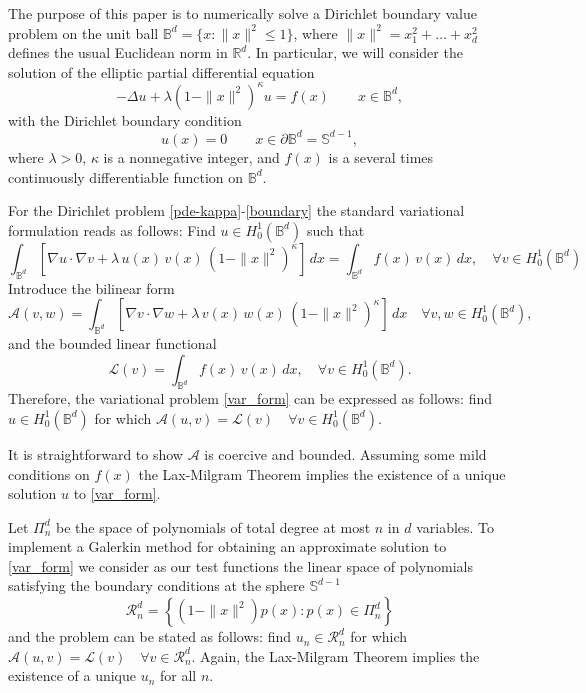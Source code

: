 \documentclass{amsart}
\theoremstyle{plain}%
\theoremstyle{definition}
\theoremstyle{remark}
\begin{document}
The purpose of this paper is to numerically solve a Dirichlet boundary value problem on the 
unit ball \(\mathbb{B}^d = \{x: \|x\|^2\le 1\}\), where \(\|x\|^2 = x_1^2 + \ldots +x_d^2\) defines the usual Euclidean norm in \(\mathbb{R}^d\). In particular, we will consider the solution of the elliptic partial differential equation
\begin{equation} \label{pde-kappa}
 -  \Delta u  + \lambda(1-\|x\|^2)^{\kappa}u = f(x) \qquad x \in {\mathbb B}^d,
\end{equation}
with the Dirichlet boundary condition
\begin{equation} \label{boundary}
 u(x)= 0 \qquad x \in \partial\mathbb{B}^d = {\mathbb S}^{d-1},
\end{equation}
where \(\lambda>0\), \(\kappa\) is a nonnegative integer, and \(f(x)\) is a several times continuously differentiable function on \({\mathbb B}^d\).

For the Dirichlet problem \eqref{pde-kappa}-\eqref{boundary} the standard variational formulation reads as follows: Find \(u \in H^1_0({\mathbb B}^d)\) such that
\begin{equation} \label{var_form}
\int_{{\mathbb B}^d} \left[\nabla u \cdot\nabla v + \lambda\, u(x)\,v(x)\,(1-\|x\|^2)^{\kappa}\right]\,dx = \int_{{\mathbb B}^d} f(x)\, v(x)\,dx, \quad \forall 
v \in H^1_0({\mathbb B}^d)
\end{equation}
Introduce the bilinear form  
\begin{equation} \label{bil_form_A}
\mathcal{A}(v,w) = \int_{{\mathbb B}^d} \left[\nabla v \cdot\nabla w + \lambda\, v(x)\,w(x)\,(1-\|x\|^2)^{\kappa}\right]\,dx  \quad \forall 
v, w \in H^1_0({\mathbb B}^d),
\end{equation}
and the bounded linear functional
\[
\mathcal{L}(v) = \int_{{\mathbb B}^d} f(x)\, v(x)\,dx, \quad \forall 
v \in H^1_0({\mathbb B}^d).
\]
Therefore, the variational problem \eqref{var_form} can be expressed as follows: find \(u \in H^1_0({\mathbb B}^d)\) for which \(\mathcal{A}(u,v) = \mathcal{L}(v) \quad \forall v \in H^1_0({\mathbb B}^d).\) 

It is straightforward to show \(\mathcal{A}\) is coercive and bounded. Assuming some mild conditions on \(f(x)\) the Lax-Milgram Theorem implies the existence of a unique solution \(u\) to \eqref{var_form}. 

Let $\Pi_n^d$ be the space of polynomials of total degree at most $n$ in $d$ variables. 
To implement a Galerkin method for obtaining an approximate solution to \eqref{var_form} we consider as our test functions the linear space of polynomials satisfying the boundary conditions at the sphere \({\mathbb S}^{d-1}\)
\begin{equation} \label{space_Rn}
\mathcal{R}_n^d = \left\{(1-\|x\|^2) p(x): p(x) \in \Pi_n^d\right\}
\end{equation}
and the problem can be stated as follows: find \(u_n \in \mathcal{R}_n^d\) for which \(\mathcal{A}(u,v) = \mathcal{L}(v) \quad \forall v \in \mathcal{R}_n^d\). Again, the Lax-Milgram Theorem implies the existence of a unique \(u_n\) for all \(n\).
 
\end{document}
